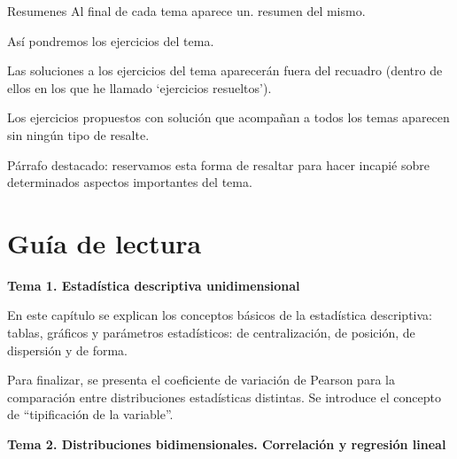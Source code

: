 \vspace{5mm} %
\begin{myblock}{Resumenes}
	Al final de cada tema aparece un. resumen del mismo.
\end{myblock}


\vspace{5mm} %
\begin{ejemplo}
\begin{ejre}
	Así pondremos los ejercicios del tema.
	
\end{ejre}
Las soluciones a los ejercicios del tema aparecerán fuera del recuadro (dentro de ellos en los que he llamado `ejercicios resueltos').
\end{ejemplo}

Los ejercicios propuestos con solución que acompañan a todos los temas aparecen sin ningún tipo de resalte.

\vspace{5mm} %
\begin{destacado}
Párrafo destacado: reservamos esta forma de resaltar para hacer incapié sobre determinados aspectos importantes del tema.

\end{destacado}


\section{Guía de lectura}

\textbf{Tema 1. Estadística descriptiva unidimensional}

\begin{adjustwidth}{50pt}{25pt}
En este capítulo se explican los conceptos básicos de la estadística descriptiva: tablas, gráficos y parámetros estadísticos: de centralización, de posición, de dispersión y de forma.

Para finalizar, se presenta el coeficiente de variación de Pearson para la comparación entre distribuciones estadísticas distintas. Se introduce el concepto de  ``tipificación de la variable''.
\end{adjustwidth}

\textbf{Tema 2. Distribuciones bidimensionales. Correlación y regresión lineal}

